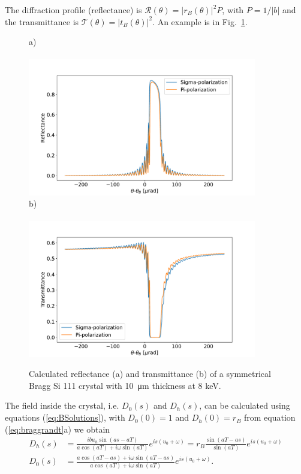 \documentclass{iucr}
\begin{document}
The diffraction profile (reflectance) is   $\mathcal{R}(\theta)=|r_B(\theta)|^2 P$, with $P=1/|b|$ and the transmittance is $\mathcal{T}(\theta)=|t_B(\theta)|^2$. An example is in Fig.~\ref{fig:braggProfiles}. 

\begin{figure}\label{fig:braggProfiles}
    \centering
    a)~~~~~~~~~~~~~~~~~~~~~~~~~~~~~~~~~~~~~~~~~~~~~~~~~~~~~~~~~~~~~~~~~~~~~\\\includegraphics[width=0.89\textwidth]{figures/Bragg_1.pdf}
    b)~~~~~~~~~~~~~~~~~~~~~~~~~~~~~~~~~~~~~~~~~~~~~~~~~~~~~~~~~~~~~~~~~~~~~\\\includegraphics[width=0.89\textwidth]{figures/Bragg_2.pdf}
    \caption{Calculated reflectance (a) and transmittance (b) of a symmetrical Bragg Si 111 crystal with \SI{10}{\micro\meter} thickness at 8 keV.}
\end{figure}

The field inside the crystal, i.e. $D_0(s)$ and $D_h(s)$, can be calculated using equations (\ref{eq:BSolutions}), with $D_0(0)=1$ and $D_h(0)=r_B$ from equation (\ref{eq:braggrandt}a) we obtain
\begin{subequations}\label{eq:bragginside}
\begin{align}
D_h(s)&=\frac{i b u_h \sin(as - aT)}{a \cos(aT) + i \omega \sin(aT)} e^{is(u_0+\omega)} 
= r_B \frac{\sin(aT - as)}{\sin(aT)} e^{is(u_0+\omega)}\\
D_0(s)&= \frac{a \cos(aT-as) + i \omega \sin(aT-as)}{a \cos(aT) + i \omega \sin(aT)} e^{is(u_0+\omega)}.
\end{align}
\end{subequations}
\end{document}
